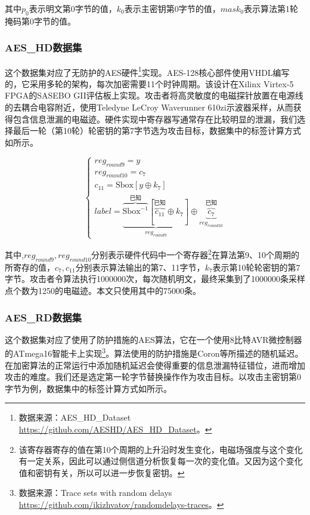 {	\noindent 其中$p_0$表示明文第0字节的值，$k_0$表示主密钥第0字节的值，$mask_0$表示算法第1轮掩码第0字节的值。
	
	\subsubsection{AES\_HD数据集}
	这个数据集对应了无防护的AES硬件\footnote{数据来源：AES\_HD\_Dataset \href{https://github.com/AESHD/AES\_HD\_Dataset}{https://github.com/AESHD/AES\_HD\_Dataset}。}实现。AES-128核心部件使用VHDL编写的，它采用多轮的架构，每次加密需要11个时钟周期。该设计在Xilinx Virtex-5 FPGA的SASEBO GII评估板上实现。攻击者将高灵敏度的电磁探针放置在电源线的去耦合电容附近，使用Teledyne LeCroy Waverunner 610zi示波器采样，从而获得包含信息泄漏的电磁迹。硬件实现中寄存器写通常存在比较明显的泄漏，我们选择最后一轮（第10轮）轮密钥的第7字节选为攻击目标，数据集中的标签计算方式如所示。
	
	\begin{equation}
		\begin{cases}
			reg_{round9}=y\\
			reg_{round10}=c_{7}\\
			c_{11}=\mathrm{Sbox}[y\oplus k_7]\\
			label =\underbrace{\overbrace{\mathrm{Sbox}^{-1}}^{\mbox{已知}}[\overbrace{c_{11}}^{\mbox{已知}}\oplus k_{7}]}_{reg_{round9}}\oplus \underbrace{\overbrace{c_{7}}^{\mbox{已知}}}_{reg_{round10}}
		\end{cases}\label{eq:aeshdmodel}
	\end{equation}
	
	\noindent 其中,$reg_{round9},reg_{round10}$分别表示硬件代码中一个寄存器\footnote{该寄存器寄存的值在第10个周期的上升沿时发生变化，电磁场强度与这个变化有一定关系，因此可以通过侧信道分析恢复每一次的变化值。又因为这个变化值和密钥有关，所以可以进一步恢复密钥。}在算法第9、10个周期的所寄存的值，$c_7,c_{11}$分别表示算法输出的第7、11字节，$k_7$表示第10轮轮密钥的第7字节。攻击者令算法执行1000000次，每次随机明文，最终采集到了1000000条采样点个数为1250的电磁迹。本文只使用其中的75000条。
	
	\subsubsection{AES\_RD数据集}
	这个数据集对应了使用了防护措施的AES算法，它在一个使用8比特AVR微控制器的ATmega16智能卡上实现\footnote{数据来源：Trace sets with random delays \href{https://github.com/ikizhvatov/randomdelays-traces}{https://github.com/ikizhvatov/randomdelays-traces}。}。算法使用的防护措施是Coron等\citep{Coron09}所描述的随机延迟。在加密算法的正常运行中添加随机延迟会使得重要的信息泄漏特征错位，进而增加攻击的难度。我们还是选定第一轮字节替换操作作为攻击目标。以攻击主密钥第0字节为例，数据集中的标签计算方式如所示。
	
}
